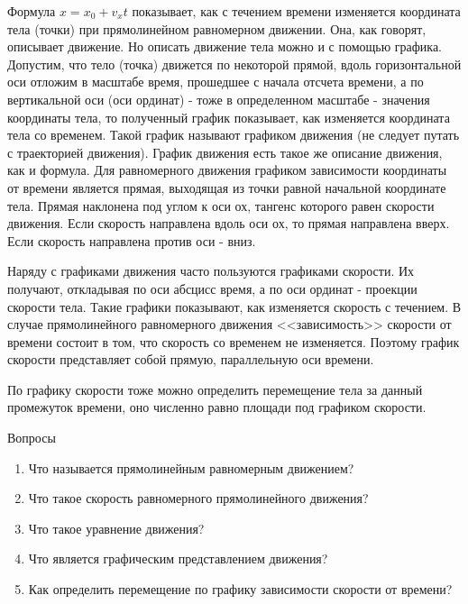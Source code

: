 \documentclass[a6paper, 11pt]{diss_4}
\renewcommand{\'}{\,'}
\begin{document}
  Формула $x=x_0+v_xt$ показывает, как с течением времени изменяется координата
 тела (точки) при прямолинейном равномерном движении. Она, как говорят,
описывает движение. Но описать движение тела можно и с помощью графика.
Допустим, что тело (точка) движется по некоторой прямой, вдоль горизонтальной
оси отложим в масштабе время, прошедшее с начала отсчета времени, а по
вертикальной оси (оси ординат) - тоже в определенном масштабе - значения
координаты тела, то полученный график показывает, как изменяется координата
тела со временем. Такой график называют графиком движения (не следует путать
с траекторией движения). График движения есть такое же описание движения, как
и формула. Для равномерного движения графиком зависимости координаты от
времени является прямая, выходящая из точки равной начальной координате тела.
Прямая наклонена под углом к оси ох, тангенс которого равен скорости
движения. Если скорость направлена вдоль оси ох, то прямая направлена вверх.
Если скорость направлена против оси - вниз.

 Наряду с графиками движения часто пользуются графиками скорости. Их получают,
откладывая по оси абсцисс время, а по оси ординат - проекции скорости тела.
Такие графики показывают, как изменяется скорость с течением. В случае
прямолинейного равномерного движения <<зависимость>> скорости от времени
состоит в том, что скорость со временем не изменяется. Поэтому график
скорости представляет собой прямую, параллельную оси времени.

  По графику скорости тоже можно определить перемещение тела за данный
промежуток времени, оно численно равно площади под графиком скорости.

\begin{center}
   Вопросы
\end{center}

\begin{enumerate}
\item Что называется прямолинейным равномерным движением?

\item Что такое скорость равномерного прямолинейного движения?

\item Что такое уравнение движения?

\item Что является графическим представлением движения?

\item Как определить перемещение по графику зависимости скорости от времени?
\end{enumerate}
\end{document}
